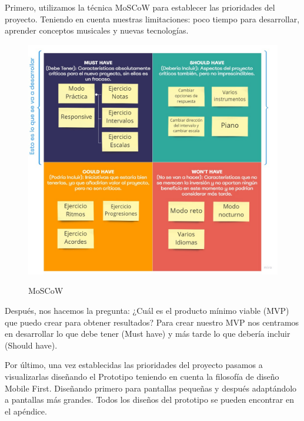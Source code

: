 \documentclass[12pt,twoside,titlepage]{report}
\begin{document}
Primero, utilizamos la técnica MoSCoW para establecer las prioridades del proyecto. Teniendo en cuenta nuestras limitaciones: poco tiempo para desarrollar, aprender conceptos musicales y nuevas tecnologías. 

\begin{figure}[H]
    \centering
    \includegraphics[scale=0.35]{Design Thinking/MosCow}
    \label{fig:MoSCoW}
    \caption{MoSCoW}
\end{figure}

Después, nos hacemos la pregunta: ¿Cuál es el producto mínimo viable (MVP) que puedo crear para obtener resultados? Para crear nuestro MVP nos centramos en desarrollar lo que debe tener (Must have) y más tarde lo que debería incluir (Should have).

Por último, una vez establecidas las prioridades del proyecto pasamos a visualizarlas diseñando el Prototipo teniendo en cuenta la filosofía de diseño Mobile First. Diseñando primero para pantallas pequeñas y después adaptándolo a pantallas más grandes. Todos los diseños del prototipo se pueden encontrar en el apéndice.
    
\end{document}
